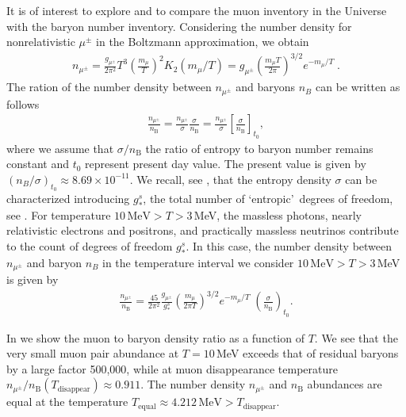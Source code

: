 It is of interest to explore and to compare the muon inventory in the Universe with the baryon number inventory. Considering the number density for nonrelativistic $\mu^\pm$ in the Boltzmann approximation, we obtain
\begin{align}\label{nmupm}
n_{\mu^\pm}=\frac{g_{\mu^\pm}}{2\pi^2}T^3\left(\frac{m_\mu}{T}\right)^2 K_2(m_\mu/T)=g_{\mu^\pm}\left(\frac{m_\mu T}{2\pi}\right)^{3/2}e^{-{m_\mu}/{T}}\;. 
\end{align}
The ration of the number density between $n_{\mu^\pm}$ and baryons $n_B$ can be written as follows
\begin{align}
\frac{n_{\mu^\pm}}{n_\mathrm{B}}=\frac{n_{\mu^\pm}}{\sigma}\frac{\sigma}{n_\mathrm{B}}=
\frac{n_{\mu^\pm}}{\sigma}\left[\frac{\sigma}{n_\mathrm{B}}\right]_{t_0},
\end{align}
where we assume that $\sigma/n_\mathrm{B}$ the ratio of entropy to baryon number remains constant and $t_0$ represent present day value. The present value is given by $(n_B/\sigma)_{t_0}\approx8.69\times10^{-11}$. We recall, see , that the entropy density $\sigma$ can be characterized introducing $g^s_\ast$, the total number of \lq entropic\rq\ degrees of freedom, see . For temperature $10\,\mathrm{MeV} >T>3 $\,MeV, the massless photons, nearly relativistic electrons and positrons, and practically massless neutrinos contribute to the count of degrees of freedom $g^s_\ast$. In this case, the number density between $n_{\mu^\pm}$ and baryon $n_B$ in the temperature interval we consider $10\,\mathrm{MeV} >T>3 $\,MeV is given by
\begin{align}\label{nmuperbF} 
\frac{n_{\mu^\pm}}{n_\mathrm{B}}=\frac{45}{2\pi^2}\frac{g_{\mu^\pm}}{g^s_\ast}\left(\frac{m_\mu}{2\pi T}\right)^{3/2}e^{-{m_\mu}/{T}}\;\left(\frac{\sigma}{n_\mathrm{B}}\right)_{\!t_0}.
\end{align}

In  we show the muon to baryon density ratio  as a function of $T$. We see that the very small muon pair abundance at $T=10$\,MeV exceeds that of residual baryons by a large factor 500,000, while at muon disappearance temperature $n_{\mu^\pm}/n_\mathrm{B}(T_\mathrm{disappear})\approx0.911$. The number density $n_{\mu^\pm}$ and $n_\mathrm{B}$ abundances are equal at the temperature $T_\mathrm{equal}\approx4.212\,\mathrm{MeV} > T_\mathrm{disappear}$. 

